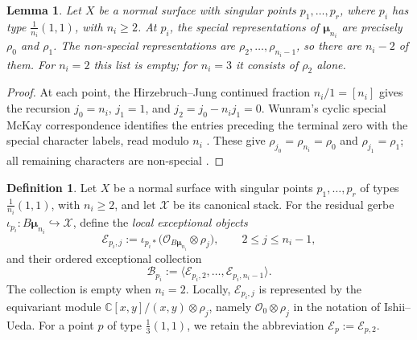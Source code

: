 \documentclass[11pt]{article}
\theoremstyle{plain}
\newtheorem{lemma}[lemma]{Lemma}
\theoremstyle{definition}
\newtheorem{definition}[definition]{Definition}
\theoremstyle{remark}
\newcommand{\C}{\mathbb C}
\newcommand{\XX}{\mathcal X}
\newcommand{\OO}{\mathcal O}
\begin{document}
\begin{lemma}\label{lem:non-special-cyclic}
Let \(X\) be a normal surface with singular points \(p_1,\ldots,p_r\), where \(p_i\) has
type \(\frac1{n_i}(1,1)\), with \(n_i\geq2\). At \(p_i\), the
special representations of \(\boldsymbol\mu_{n_i}\) are precisely
\(\rho_0\) and \(\rho_1\). The non-special representations are
\(\rho_2,\ldots,\rho_{n_i-1}\), so there are \(n_i-2\) of them.
For \(n_i=2\) this list is empty; for \(n_i=3\) it consists of
\(\rho_2\) alone.
\end{lemma}

\begin{proof}
At each point, the Hirzebruch--Jung continued fraction
\(n_i/1=[n_i]\) gives the recursion
\(j_0=n_i\), \(j_1=1\), and \(j_2=j_0-n_i j_1=0\).
Wunram's cyclic special McKay correspondence identifies the entries
preceding the terminal zero with the special character labels, read
modulo \(n_i\) \cite[Theorems~2.3 and~3.2]{Ishii2015}.
These give \(\rho_{j_0}=\rho_{n_i}=\rho_0\) and
\(\rho_{j_1}=\rho_1\); all remaining characters are non-special
\cite[Example~2.6]{GugiattiRota2023}.
\end{proof}

\begin{definition}\label{def:local-cyclic-blocks}
Let \(X\) be a normal surface with singular points \(p_1,\ldots,p_r\) of types
\(\frac1{n_i}(1,1)\), with \(n_i\geq2\), and let \(\XX\) be its
canonical stack. For the residual gerbe
\(\iota_{p_i}:B\boldsymbol\mu_{n_i}\hookrightarrow\XX\),
define the \emph{local exceptional objects}
\[
\mathcal E_{p_i,j}:=
\iota_{p_i*}\bigl(\OO_{B\boldsymbol\mu_{n_i}}\otimes\rho_j\bigr),
\qquad 2\leq j\leq n_i-1,
\]
and their ordered exceptional collection
\[
\mathscr B_{p_i}:=
\langle\mathcal E_{p_i,2},\ldots,\mathcal E_{p_i,n_i-1}\rangle.
\]
The collection is empty when \(n_i=2\). Locally,
\(\mathcal E_{p_i,j}\) is represented by the equivariant module
\(\C[x,y]/(x,y)\otimes\rho_j\),
namely \(\OO_0\otimes\rho_j\) in the notation of Ishii--Ueda.
For a point \(p\) of type \(\frac13(1,1)\), we retain the abbreviation
\(\mathcal E_p:=\mathcal E_{p,2}\).
\end{definition}
\end{document}
